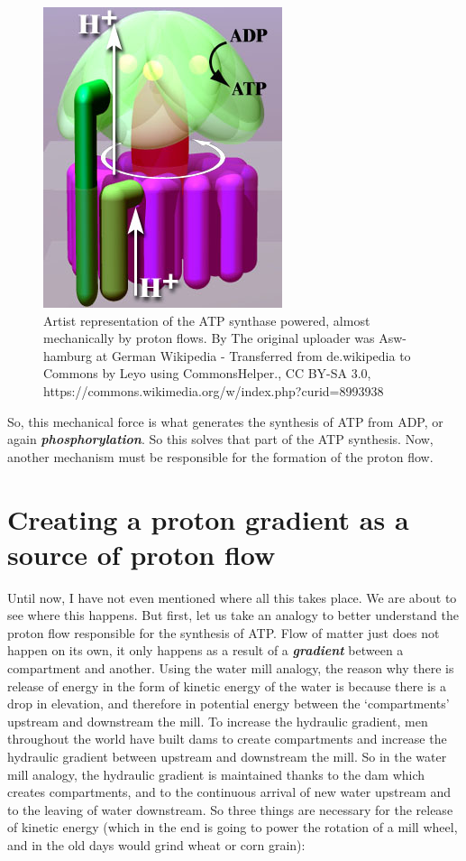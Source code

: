 \documentclass[]{book}
\theoremstyle{definition}
\theoremstyle{definition}
\theoremstyle{definition}
\theoremstyle{remark}
\begin{document}
\begin{figure}

{\centering \includegraphics[width=0.4\linewidth]{pictures/Atpsyntase4} 

}

\caption{Artist representation of the ATP synthase powered, almost mechanically by proton flows. By The original uploader was Asw-hamburg at German Wikipedia - Transferred from de.wikipedia to Commons by Leyo using CommonsHelper., CC BY-SA 3.0, https://commons.wikimedia.org/w/index.php?curid=8993938}\label{fig:ATPase}
\end{figure}

So, this mechanical force is what generates the synthesis of ATP from
ADP, or again \emph{\textbf{phosphorylation}}. So this solves that part
of the ATP synthesis. Now, another mechanism must be responsible for the
formation of the proton flow.

\section{Creating a proton gradient as a source of proton
flow}\label{creating-a-proton-gradient-as-a-source-of-proton-flow}

Until now, I have not even mentioned where all this takes place. We are
about to see where this happens. But first, let us take an analogy to
better understand the proton flow responsible for the synthesis of ATP.
Flow of matter just does not happen on its own, it only happens as a
result of a \emph{\textbf{gradient}} between a compartment and another.
Using the water mill analogy, the reason why there is release of energy
in the form of kinetic energy of the water is because there is a drop in
elevation, and therefore in potential energy between the `compartments'
upstream and downstream the mill. To increase the hydraulic gradient,
men throughout the world have built dams to create compartments and
increase the hydraulic gradient between upstream and downstream the
mill. So in the water mill analogy, the hydraulic gradient is maintained
thanks to the dam which creates compartments, and to the continuous
arrival of new water upstream and to the leaving of water downstream. So
three things are necessary for the release of kinetic energy (which in
the end is going to power the rotation of a mill wheel, and in the old
days would grind wheat or corn grain):
\end{document}
